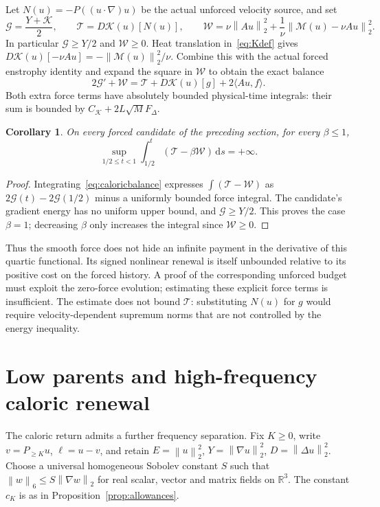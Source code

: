 \documentclass[11pt]{article}
\newtheorem{corollary}[proposition]{Corollary}
\newcommand{\R}{\mathbb R}
\newcommand{\dd}{\,\mathrm d}
\newcommand{\norm}[1]{\left\lVert#1\right\rVert}
\begin{document}
Let $N(u)=-P((u\cdot\nabla)u)$ be the actual unforced velocity source, and set
\[
 \mathcal G=\frac{Y+\mathcal K}{2},\qquad
 \mathcal T=D\mathcal K(u)[N(u)],\qquad
 \mathcal W=\nu\norm{Au}_2^2+
                   \frac1\nu\norm{\mathcal M(u)-\nu Au}_2^2.
\]
In particular $\mathcal G\geq Y/2$ and $\mathcal W\geq0$.
Heat translation in~\eqref{eq:Kdef} gives
$D\mathcal K(u)[-\nu Au]=-\norm{\mathcal M(u)}_2^2/\nu$.
Combine this with the actual forced enstrophy identity and expand the
square in $\mathcal W$ to obtain the exact balance
\begin{equation}\label{eq:caloricbalance}
 2\mathcal G'+\mathcal W
 =\mathcal T+D\mathcal K(u)[g]+2\langle Au,f\rangle.
\end{equation}
Both extra force terms have absolutely bounded physical-time integrals:
their sum is bounded by $C_{\mathcal K}+2L\sqrt M F_\Delta$.

\begin{corollary}\label{cor:caloricforced}
On every forced candidate of the preceding section, for every $\beta\leq1$,
\[
 \sup_{1/2\leq t<1}\int_{1/2}^t
          (\mathcal T-\beta\mathcal W)\dd s=+\infty.
\]
\end{corollary}
\begin{proof}
Integrating~\eqref{eq:caloricbalance} expresses
$\int(\mathcal T-\mathcal W)$ as
$2\mathcal G(t)-2\mathcal G(1/2)$ minus a uniformly bounded force integral.
The candidate's gradient energy has no uniform upper bound, and
$\mathcal G\geq Y/2$. This proves the case $\beta=1$; decreasing $\beta$
only increases the integral since $\mathcal W\geq0$.
\end{proof}

Thus the smooth force does not hide an infinite payment in the derivative
of this quartic functional. Its signed nonlinear renewal is itself
unbounded relative to its positive cost on the forced history. A proof
of the corresponding unforced budget must exploit the zero-force
evolution; estimating these explicit force terms is insufficient.
The estimate does not bound $\mathcal T$: substituting $N(u)$ for $g$
would require velocity-dependent supremum norms that are not controlled
by the energy inequality.

\section{Low parents and high-frequency caloric renewal}

The caloric return admits a further frequency separation. Fix $K\geq0$,
write $v=P_{\geq K}u$, $\ell=u-v$, and retain $E=\norm u_2^2$,
$Y=\norm{\nabla u}_2^2$, $D=\norm{\Delta u}_2^2$.
Choose a universal homogeneous Sobolev constant $S$ such that
$\norm w_6\leq S\norm{\nabla w}_2$ for real scalar, vector and matrix
fields on $\R^3$. The constant $c_K$ is as in Proposition~\ref{prop:allowances}.
\end{document}
